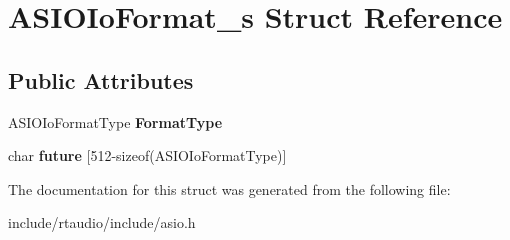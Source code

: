 \hypertarget{struct_a_s_i_o_io_format__s}{}\section{A\+S\+I\+O\+Io\+Format\+\_\+s Struct Reference}
\label{struct_a_s_i_o_io_format__s}
\subsection*{Public Attributes}
\begin{DoxyCompactItemize}
\item 
A\+S\+I\+O\+Io\+Format\+Type {\bfseries Format\+Type}\hypertarget{struct_a_s_i_o_io_format__s_a5af625fa0760c05914e5ddab6e32eac1}{}\label{struct_a_s_i_o_io_format__s_a5af625fa0760c05914e5ddab6e32eac1}

\item 
char {\bfseries future} \mbox{[}512-\/sizeof(A\+S\+I\+O\+Io\+Format\+Type)\mbox{]}\hypertarget{struct_a_s_i_o_io_format__s_a0a505b97fdd62ff7cbd81ca9119648fa}{}\label{struct_a_s_i_o_io_format__s_a0a505b97fdd62ff7cbd81ca9119648fa}

\end{DoxyCompactItemize}


The documentation for this struct was generated from the following file\+:\begin{DoxyCompactItemize}
\item 
include/rtaudio/include/asio.\+h\end{DoxyCompactItemize}
